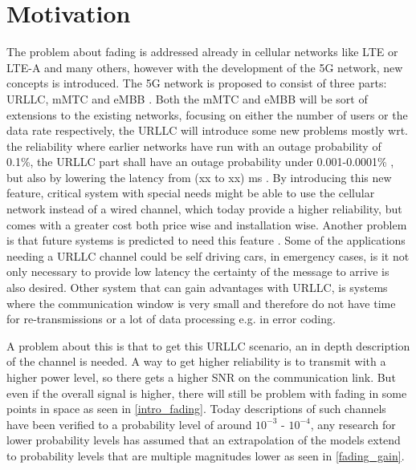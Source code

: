 \section{Motivation}
The problem about fading is addressed already in cellular networks like \gls{LTE} or \gls{LTE-A} and many others, however with the development of the 5G network, new concepts is introduced. The 5G network is proposed to consist of three parts: \Gls{URLLC}, \gls{mMTC} and \gls{eMBB} \citep{5G}. Both the \gls{mMTC} and \gls{eMBB} will be sort of extensions to the existing networks, focusing on either the number of users or the data rate respectively, the \gls{URLLC} will introduce some new problems mostly wrt. the reliability where earlier networks have run with an outage probability of 0.1\%, the URLLC part shall have an outage probability under 0.001-0.0001\% , but also by lowering the latency from (xx to xx) ms . By introducing this new feature, critical system with special needs might be able to use the cellular network instead of a wired channel, which today provide a higher reliability, but comes with a greater cost both price wise and installation wise. Another problem is that future systems is predicted to need this feature . %
Some of the applications needing a URLLC channel could be self driving cars, in emergency cases, is it not only necessary to provide low latency the certainty of the message to arrive is also desired. %
Other system that can gain advantages with URLLC, is systems where the communication window is very small and therefore do not have time for re-transmissions or a lot of data processing e.g. in error coding.


A problem about this is that to get this URLLC scenario, an in depth description of the channel is needed. A way to get higher reliability is to transmit with a higher power level, so there gets a higher \gls{SNR} on the communication link. But even if the overall signal is higher, there will still be problem with fading in some points in space as seen in \autoref{intro_fading}. Today descriptions of such channels have been verified to a probability level of around $10^{-3}$ - $10^{-4}$, any research for lower probability levels has assumed that an extrapolation of the models extend to probability levels that are multiple magnitudes lower as seen in \autoref{fading_gain}.


